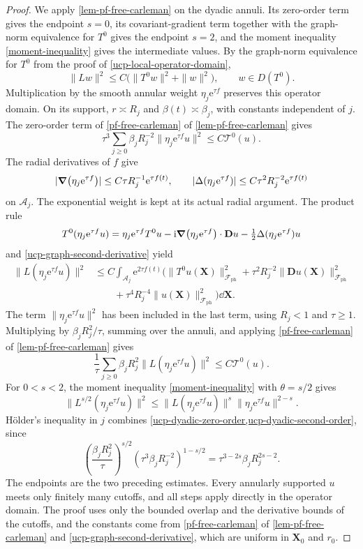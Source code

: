 \documentclass[final,reqno]{amsart}
\theoremstyle{remark}
\renewcommand{\i}{\mathrm{i}}
\newcommand{\e}{\mathrm{e}}
\newcommand{\DC}{D}
\newcommand{\ph}{\mathrm{ph}}
\newcommand{\Fock}{\mathcal{F}}
\newcommand{\vX}{{\mathbf{X}}}
\newcommand{\vD}{{\mathbf{D}}}
\begin{document}
\begin{proof}
We apply \cref{lem-pf-free-carleman} on the dyadic annuli.  Its
zero-order term gives the endpoint $s=0$, its covariant-gradient term
together with the graph-norm equivalence for $T^0$ gives the endpoint
$s=2$, and the moment inequality \cref{moment-inequality} gives the
intermediate values.
By the graph-norm equivalence for $T^0$ from the proof of
\cref{ucp-local-operator-domain},
\begin{equation}\label{ucp-graph-second-derivative}
 \|Lw\|^2\leq C\big(\|T^0w\|^2+\|w\|^2\big),\qquad w\in\DC(T^0).
\end{equation}
Multiplication by the smooth annular weight $\eta_j\e^{\tau f}$ preserves
this operator domain.  On its support, $r\asymp R_j$ and
$\beta(t)\asymp\beta_j$, with constants independent of $j$.
The zero-order term of \cref{pf-free-carleman} of \cref{lem-pf-free-carleman} gives
\begin{equation}\label{ucp-dyadic-zero-order}
 \tau^3\sum_{j\geq0}\beta_jR_j^{-2}\|\eta_j\e^{\tau f}u\|^2\leq C \mathcal T^0(u).
\end{equation}
The radial derivatives of $f$ give
\[
 |\grad(\eta_j\e^{\tau f})|\leq C\tau R_j^{-1}\e^{\tau f(t)},\qquad
 |\Delta(\eta_j\e^{\tau f})|\leq C\tau^2R_j^{-2}\e^{\tau f(t)}
\]
on $\mathcal A_j$.
The exponential weight is kept at its actual radial argument.
The product rule
\[
 T^0(\eta_j\e^{\tau f}u)=\eta_j\e^{\tau f}T^0u
   -\i\grad(\eta_j\e^{\tau f})\cdot\vD u
   -\tfrac12\Delta(\eta_j\e^{\tau f})u
\]
and \cref{ucp-graph-second-derivative} yield
\[
 \begin{split}
 \|L(\eta_j\e^{\tau f}u)\|^2
 &\leq C\int_{\mathcal A_j}\e^{2\tau f(t)}
  \bigl(\|T^0u(\vX)\|_{\Fock_\ph}^2+\tau^2R_j^{-2}\|\vD u(\vX)\|_{\Fock_\ph}^2\\
 &\qquad+\tau^4R_j^{-4}\|u(\vX)\|_{\Fock_\ph}^2\bigr)\dd\vX.
 \end{split}
\]
The term $\|\eta_j\e^{\tau f}u\|^2$ has been included in the last term, using
$R_j<1$ and $\tau\geq1$.  Multiplying by $\beta_jR_j^2/\tau$,
summing over the annuli, and applying \cref{pf-free-carleman} of \cref{lem-pf-free-carleman} gives
\begin{equation}\label{ucp-dyadic-second-order}
 \frac{1}{\tau}\sum_{j\geq0}\beta_jR_j^2\|L(\eta_j\e^{\tau f}u)\|^2\leq C \mathcal T^0(u).
\end{equation}
For $0<s<2$, the moment inequality \cref{moment-inequality} with
$\theta=s/2$ gives
\[
 \|L^{s/2}(\eta_j\e^{\tau f}u)\|^2\leq\|L(\eta_j\e^{\tau f}u)\|^s\|\eta_j\e^{\tau f}u\|^{2-s}.
\]
H\"older's inequality in $j$ combines
\cref{ucp-dyadic-zero-order,ucp-dyadic-second-order}, since
\[
 \left(\frac{\beta_jR_j^2}{\tau}\right)^{s/2}
 \left(\tau^3\beta_jR_j^{-2}\right)^{1-s/2}
 =\tau^{3-2s}\beta_jR_j^{2s-2}.
\]
The endpoints are the two preceding estimates.  Every annularly
supported $u$ meets only finitely many cutoffs, and all steps apply
directly in the operator domain.  The proof uses only the bounded
overlap and the derivative bounds of the cutoffs, and the constants
come from \cref{pf-free-carleman} of \cref{lem-pf-free-carleman} and \cref{ucp-graph-second-derivative}, which
are uniform in $\vX_0$ and $r_0$.
\end{proof}
\end{document}
